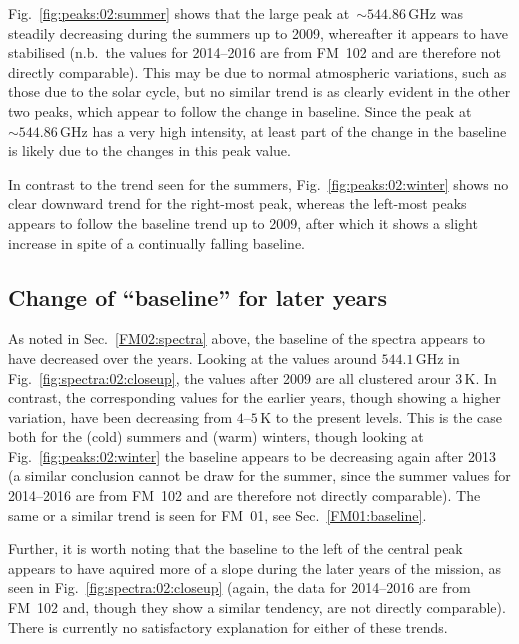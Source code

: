 \noindent
Fig.~\ref{fig:peaks:02:summer} shows that the large  peak
at~$\sim544.86\,\mathrm{GHz}$ was steadily decreasing during the summers up to
2009, whereafter it appears to have stabilised (n.b.~the values for 2014--2016
are from FM~102 and are therefore not directly comparable).  This may be due to
normal atmospheric variations, such as those due to the solar cycle, but no
similar trend is as clearly evident in the other two peaks, which appear to
follow the change in baseline.  Since the peak at~$\sim544.86\,\mathrm{GHz}$
has a very high intensity, at least part of the change in the baseline is
likely due to the changes in this peak value.

In contrast to the trend seen for the summers, Fig.~\ref{fig:peaks:02:winter}
shows no clear downward trend for the right-most peak, whereas the left-most
 peaks appears to follow the baseline trend up to 2009, after which
it shows a slight increase in spite of a continually falling baseline.


\subsection{Change of ``baseline'' for later years}
\label{FM02:baseline}
As noted in Sec.~\ref{FM02:spectra} above, the baseline of the spectra appears
to have decreased over the years. Looking at the values around
$544.1\,\mathrm{GHz}$ in Fig.~\ref{fig:spectra:02:closeup}, the values after
2009 are all clustered arour $3\,\mathrm{K}$.  In contrast, the corresponding
values for the earlier years, though showing a higher variation, have been
decreasing from $4$--$5\,\mathrm{K}$ to the present levels.  This is the case
both for the (cold) summers and (warm) winters, though looking at
Fig.~\ref{fig:peaks:02:winter} the baseline appears to be decreasing again
after 2013 (a similar conclusion cannot be draw for the summer, since the
summer values for 2014--2016 are from FM~102 and are therefore not directly
comparable).  The same or a similar trend is seen for FM~01, see
Sec.~\ref{FM01:baseline}.

Further, it is worth noting that the baseline to the left of the central peak
appears to have aquired more of a slope during the later years of the mission,
as seen in Fig.~\ref{fig:spectra:02:closeup} (again, the data for 2014--2016
are from FM~102 and, though they show a similar tendency, are not directly
comparable).  There is currently no satisfactory explanation for either of
these trends.
